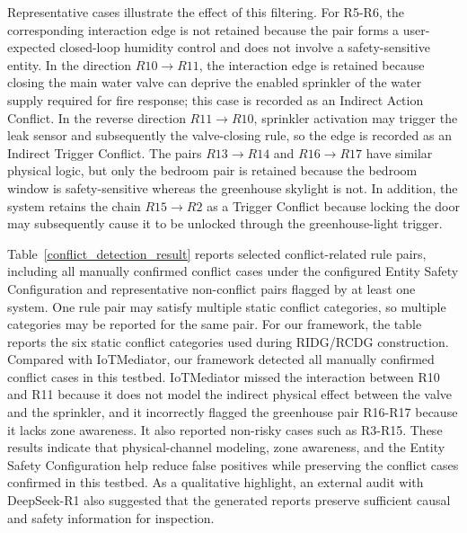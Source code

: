 Representative cases illustrate the effect of this filtering. For R5-R6, the corresponding interaction edge is not retained because the pair forms a user-expected closed-loop humidity control and does not involve a safety-sensitive entity. In the direction $R10 \rightarrow R11$, the interaction edge is retained because closing the main water valve can deprive the enabled sprinkler of the water supply required for fire response; this case is recorded as an Indirect Action Conflict. In the reverse direction $R11 \rightarrow R10$, sprinkler activation may trigger the leak sensor and subsequently the valve-closing rule, so the edge is recorded as an Indirect Trigger Conflict. The pairs $R13 \rightarrow R14$ and $R16 \rightarrow R17$ have similar physical logic, but only the bedroom pair is retained because the bedroom window is safety-sensitive whereas the greenhouse skylight is not. In addition, the system retains the chain $R15 \rightarrow R2$ as a Trigger Conflict because locking the door may subsequently cause it to be unlocked through the greenhouse-light trigger.

Table~\ref{conflict_detection_result} reports selected conflict-related rule pairs, including all manually confirmed conflict cases under the configured Entity Safety Configuration and representative non-conflict pairs flagged by at least one system. One rule pair may satisfy multiple static conflict categories, so multiple categories may be reported for the same pair. For our framework, the table reports the six static conflict categories used during RIDG/RCDG construction. Compared with IoTMediator, our framework detected all manually confirmed conflict cases in this testbed. IoTMediator missed the interaction between R10 and R11 because it does not model the indirect physical effect between the valve and the sprinkler, and it incorrectly flagged the greenhouse pair R16-R17 because it lacks zone awareness. It also reported non-risky cases such as R3-R15. These results indicate that physical-channel modeling, zone awareness, and the Entity Safety Configuration help reduce false positives while preserving the conflict cases confirmed in this testbed. As a qualitative highlight, an external audit with DeepSeek-R1 also suggested that the generated reports preserve sufficient causal and safety information for inspection.

